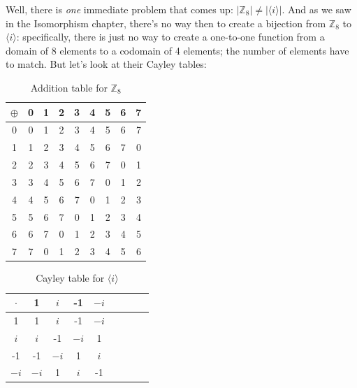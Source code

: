 Well, there is \emph{one} immediate problem that comes up:  $|{\mathbb Z_8}| \neq |\langle i \rangle|$.  And as we saw in the Isomorphism chapter, there's no way then to create a bijection from ${\mathbb Z_8}$ to $\langle i \rangle$:  specifically, there is just no way to create a one-to-one function from a domain of 8 elements to a codomain of 4 elements; the number of elements have to match.  But  let's look at their Cayley tables:

\begin{table}[H]
\caption{\label{groups_Z8_add_table2}Addition table for ${\mathbb Z}_8$}{\small
\begin{center}
\begin{tabular}{c|cccccccc}
$\oplus$ & 0 & 1 & 2 & 3 & 4 & 5 & 6 & 7 \\
\hline
0        & 0 & 1 & 2 & 3 & 4 & 5 & 6 & 7 \\
1       & 1 & 2 & 3 & 4 & 5 & 6 & 7 & 0 \\
2       & 2 & 3 & 4 & 5 & 6 & 7 & 0 & 1\\
3       & 3 & 4 & 5 & 6 & 7 & 0 & 1 & 2\\
4       & 4 & 5 & 6 & 7 & 0 & 1 & 2 & 3\\
5       & 5 & 6 & 7 & 0 & 1 & 2 & 3 & 4\\
6       & 6 & 7 & 0 & 1 & 2 & 3 & 4 & 5\\
7       & 7 & 0 & 1 & 2 & 3 & 4 & 5 & 6\\
\end{tabular}
\end{center}
}
\end{table}

\begin{table}[H]
\caption{Cayley table for $\langle i \rangle$}
\label{4_roots_table2}
{\small
\begin{center}
\begin{tabular}{c|cccccccc}
$\cdot$ & 1 &$i$ & -1 & $-i$  \\
\hline
1        & 1 &$i$ & -1 &$-i$  \\
$i$       &$i$ & -1 & $-i$ & 1  \\
-1       & -1 & $-i$ & 1 & $i$ \\
$-i$       & $-i$ & 1 & $i$ & -1 \\

\end{tabular}
\end{center}
}
\end{table}  

